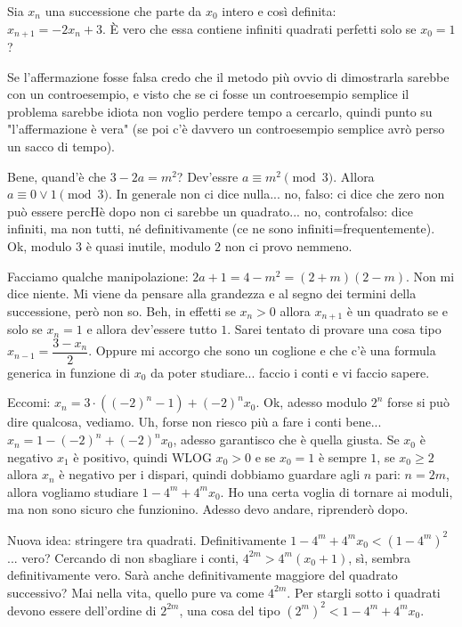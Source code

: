 \begin{prob}
  Sia $x_n$ una successione che parte da $x_0$ intero e così definita: \\ $x_{n+1}=-2x_n+3$. È vero che essa contiene infiniti quadrati perfetti solo se $x_0=1$?
\end{prob}

\begin{sol}
  Se l'affermazione fosse falsa credo che il metodo più ovvio di dimostrarla sarebbe con un controesempio, e visto che se ci fosse un controesempio semplice il problema sarebbe idiota non voglio perdere tempo a cercarlo, quindi punto su "l'affermazione è vera" (se poi c'è davvero un controesempio semplice avrò perso un sacco di tempo).

  Bene, quand'è che $3-2a=m^2$? Dev'essre $a \equiv m^2 \pmod{3}$. Allora $a \equiv 0 \lor 1 \pmod{3}$. In generale non ci dice nulla... no, falso: ci dice che zero non può essere percHè dopo non ci sarebbe un quadrato... no, controfalso: dice infiniti, ma non tutti, né definitivamente (ce ne sono infiniti=frequentemente). Ok, modulo $3$ è quasi inutile, modulo $2$ non ci provo nemmeno.

  Facciamo qualche manipolazione: $2a+1=4-m^2=(2+m)(2-m)$. Non mi dice niente. Mi viene da pensare alla grandezza e al segno dei termini della successione, però non so. Beh, in effetti se $x_n>0$ allora $x_{n+1}$ è un quadrato se e solo se $x_n=1$ e allora dev'essere tutto $1$. Sarei tentato di provare una cosa tipo $x_{n-1}=\dfrac{3-x_n}{2}$. Oppure mi accorgo che sono un coglione e che c'è una formula generica in funzione di $x_0$ da poter studiare... faccio i conti e vi faccio sapere.

  Eccomi: $x_n=3\cdot((-2)^n-1)+(-2)^nx_0$. Ok, adesso modulo $2^n$ forse si può dire qualcosa, vediamo. Uh, forse non riesco più a fare i conti bene... $x_n=1-(-2)^n+(-2)^nx_0$, adesso garantisco che è quella giusta. Se $x_0$ è negativo $x_1$ è positivo, quindi WLOG $x_0>0$ e se $x_0=1$ è sempre $1$, se $x_0 \ge 2$ allora $x_n$ è negativo per i dispari, quindi dobbiamo guardare agli $n$ pari: $n=2m$, allora vogliamo studiare $1-4^m+4^mx_0$. Ho una certa voglia di tornare ai moduli, ma non sono sicuro che funzionino. Adesso devo andare, riprenderò dopo.

  Nuova idea: stringere tra quadrati. Definitivamente $1-4^m+4^mx_0<(1-4^m)^2$... vero? Cercando di non sbagliare i conti, $4^{2m}>4^m(x_0+1)$, sì, sembra definitivamente vero. Sarà anche definitivamente maggiore del quadrato successivo? Mai nella vita, quello pure va come $4^{2m}$. Per stargli sotto i quadrati devono essere dell'ordine di $2^{2m}$, una cosa del tipo $(2^m)^2 < 1-4^m+4^mx_0$.
\end{sol}

